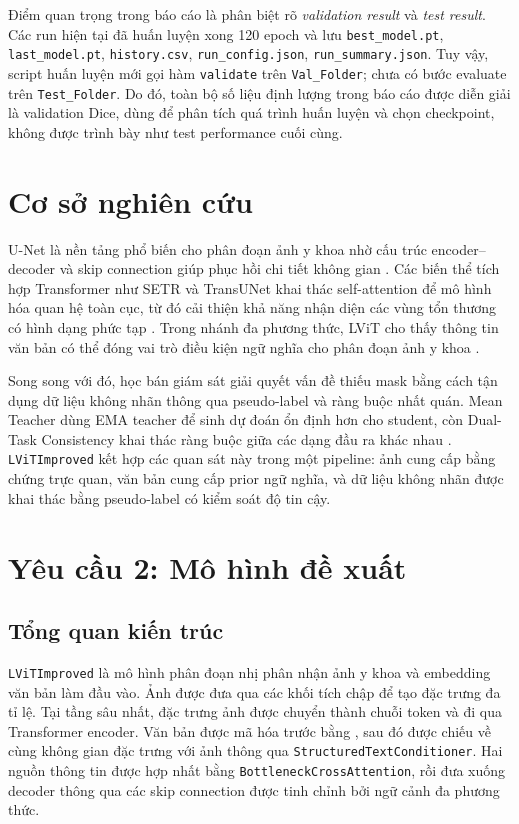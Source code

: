 Điểm quan trọng trong báo cáo là phân biệt rõ \emph{validation result} và \emph{test result}. Các run hiện tại đã huấn luyện xong 120 epoch và lưu \texttt{best\_model.pt}, \texttt{last\_model.pt}, \texttt{history.csv}, \texttt{run\_config.json}, \texttt{run\_summary.json}. Tuy vậy, script huấn luyện mới gọi hàm \texttt{validate} trên \texttt{Val\_Folder}; chưa có bước evaluate trên \texttt{Test\_Folder}. Do đó, toàn bộ số liệu định lượng trong báo cáo được diễn giải là validation Dice, dùng để phân tích quá trình huấn luyện và chọn checkpoint, không được trình bày như test performance cuối cùng.

\section{Cơ sở nghiên cứu}

U-Net là nền tảng phổ biến cho phân đoạn ảnh y khoa nhờ cấu trúc encoder--decoder và skip connection giúp phục hồi chi tiết không gian \parencite{ronneberger2015unet}. Các biến thể tích hợp Transformer như SETR và TransUNet khai thác self-attention để mô hình hóa quan hệ toàn cục, từ đó cải thiện khả năng nhận diện các vùng tổn thương có hình dạng phức tạp \parencite{zheng2021setr,chen2021transunet}. Trong nhánh đa phương thức, LViT cho thấy thông tin văn bản có thể đóng vai trò điều kiện ngữ nghĩa cho phân đoạn ảnh y khoa \parencite{li2023lvit}.

Song song với đó, học bán giám sát giải quyết vấn đề thiếu mask bằng cách tận dụng dữ liệu không nhãn thông qua pseudo-label và ràng buộc nhất quán. Mean Teacher dùng EMA teacher để sinh dự đoán ổn định hơn cho student, còn Dual-Task Consistency khai thác ràng buộc giữa các dạng đầu ra khác nhau \parencite{tarvainen2017meanteacher,luo2021dtc}. \texttt{LViTImproved} kết hợp các quan sát này trong một pipeline: ảnh cung cấp bằng chứng trực quan, văn bản cung cấp prior ngữ nghĩa, và dữ liệu không nhãn được khai thác bằng pseudo-label có kiểm soát độ tin cậy.

\section{Yêu cầu 2: Mô hình đề xuất}

\subsection{Tổng quan kiến trúc}

\texttt{LViTImproved} là mô hình phân đoạn nhị phân nhận ảnh y khoa và embedding văn bản làm đầu vào. Ảnh được đưa qua các khối tích chập để tạo đặc trưng đa tỉ lệ. Tại tầng sâu nhất, đặc trưng ảnh được chuyển thành chuỗi token và đi qua Transformer encoder. Văn bản được mã hóa trước bằng , sau đó được chiếu về cùng không gian đặc trưng với ảnh thông qua \texttt{StructuredTextConditioner}. Hai nguồn thông tin được hợp nhất bằng \texttt{BottleneckCrossAttention}, rồi đưa xuống decoder thông qua các skip connection được tinh chỉnh bởi ngữ cảnh đa phương thức.

